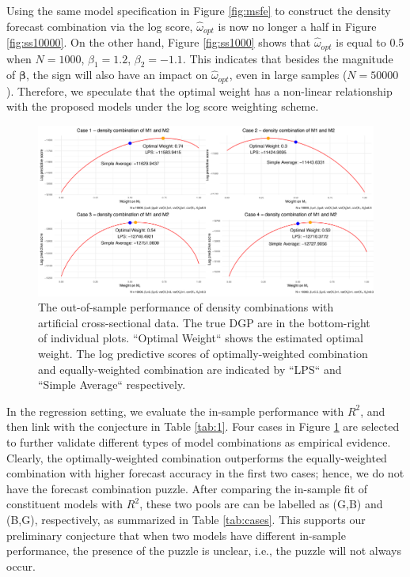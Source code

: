 \documentclass{monashthesis}
\begin{document}
Using the same model specification in Figure \ref{fig:msfe} to construct the density forecast combination via the log score, \(\hat\omega_{opt}\) is now no longer a half in Figure \ref{fig:ss10000}. On the other hand, Figure \ref{fig:ss1000} shows that \(\hat\omega_{opt}\) is equal to 0.5 when \(N = 1000\), \(\beta_1=1.2\), \(\beta_2=-1.1\). This indicates that besides the magnitude of \(\pmb{\beta}\), the sign will also have an impact on \(\hat\omega_{opt}\), even in large samples (\(N = 50000\)). Therefore, we speculate that the optimal weight has a non-linear relationship with the proposed models under the log score weighting scheme.

\begin{figure}[ht]
\centering
\includegraphics[scale=0.53]{figures/con_cases.png}
\caption{The out-of-sample performance of density combinations with artificial cross-sectional data. The true DGP are in the bottom-right of individual plots. ``Optimal Weight`` shows the estimated optimal weight. The log predictive scores of optimally-weighted combination and equally-weighted combination are indicated by ``LPS`` and ``Simple Average`` respectively.}
\label{fig:cases}
\end{figure}

In the regression setting, we evaluate the in-sample performance with \(R^2\), and then link with the conjecture in Table \ref{tab:1}. Four cases in Figure \ref{fig:cases} are selected to further validate different types of model combinations as empirical evidence. Clearly, the optimally-weighted combination outperforms the equally-weighted combination with higher forecast accuracy in the first two cases; hence, we do not have the forecast combination puzzle. After comparing the in-sample fit of constituent models with \(R^2\), these two pools are can be labelled as (G,B) and (B,G), respectively, as summarized in Table \ref{tab:cases}. This supports our preliminary conjecture that when two models have different in-sample performance, the presence of the puzzle is unclear, i.e., the puzzle will not always occur.
\end{document}
